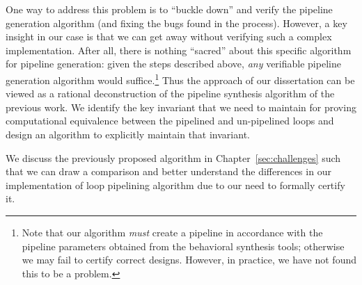 One way to address this problem is to ``buckle down'' and
verify the pipeline generation algorithm (and fixing the
bugs found in the process).  However, a key insight in our
case is that we can get away without verifying such a
complex implementation.  After all, there is nothing
``sacred'' about this specific algorithm for pipeline
generation: given the steps described above, {\em any}
verifiable pipeline generation algorithm would
suffice.\footnote{Note that our algorithm {\em must} create
  a pipeline in accordance with the pipeline parameters
  obtained from the behavioral synthesis tools; otherwise we may
  fail to certify correct designs. However, in practice, we
  have not found this to be a problem.}  Thus the approach
of our dissertation can be viewed as a rational deconstruction of
the pipeline synthesis algorithm of the previous work.  We
identify the key invariant that we need to maintain for
proving computational equivalence between the pipelined and
un-pipelined loops and design an algorithm to explicitly
maintain that invariant.

We discuss the previously proposed algorithm in Chapter~\ref{sec:challenges}
such that we can draw a comparison and better understand the differences
in our implementation of loop pipelining algorithm due to our need to formally certify it.



